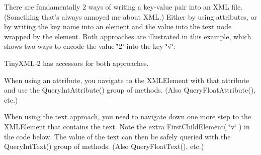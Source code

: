 

There are fundamentally 2 ways of writing a key-\/value pair into an X\+M\+L file. (Something that's always annoyed me about X\+M\+L.) Either by using attributes, or by writing the key name into an element and the value into the text node wrapped by the element. Both approaches are illustrated in this example, which shows two ways to encode the value \char`\"{}2\char`\"{} into the key \char`\"{}v\char`\"{}\+:


\begin{DoxyCodeInclude}

\end{DoxyCodeInclude}


Tiny\+X\+M\+L-\/2 has accessors for both approaches.

When using an attribute, you navigate to the X\+M\+L\+Element with that attribute and use the Query\+Int\+Attribute() group of methods. (Also Query\+Float\+Attribute(), etc.)


\begin{DoxyCodeInclude}

\end{DoxyCodeInclude}


When using the text approach, you need to navigate down one more step to the X\+M\+L\+Element that contains the text. Note the extra First\+Child\+Element( \char`\"{}v\char`\"{} ) in the code below. The value of the text can then be safely queried with the Query\+Int\+Text() group of methods. (Also Query\+Float\+Text(), etc.)


\begin{DoxyCodeInclude}

\end{DoxyCodeInclude}
 